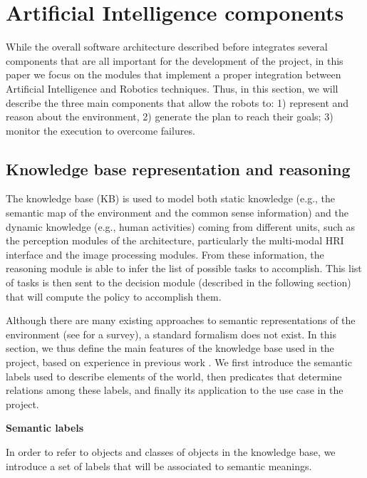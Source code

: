 \section{Artificial Intelligence components}

While the overall software architecture described before integrates several components that are all important for the development of the project, in this paper we focus on the modules that implement a proper integration between Artificial Intelligence and Robotics techniques.
Thus, in this section, we will describe the three main components that allow the robots to: 1) represent and reason about the environment, 2) generate the plan to reach their goals; 3) monitor the execution to overcome failures.



\subsection{Knowledge base representation and reasoning}


The knowledge base (KB) is used to model both static knowledge (e.g., the semantic map of the environment and the common sense information) and the dynamic knowledge (e.g., human activities) coming from different units, such as the perception modules of the architecture, particularly the multi-modal HRI interface and the image processing modules. 
From these information, the reasoning module is able to infer the list of possible tasks to accomplish. This list of tasks is then sent to the decision module (described in the following section) that will compute the policy to accomplish them. 

Although there are many existing approaches to semantic representations of the environment (see \cite{KoGa14} for a survey), a standard formalism does not exist.
In this section, we thus define the main features of the knowledge base used in the project,
based on experience in previous work \cite{icar13bastianelli}. We first introduce the semantic labels used to describe elements of the world, then predicates that determine relations among these labels, and finally its application to the use case in the project.

\vspace{1em}

\noindent 
\textbf{Semantic labels}

In order to refer to objects and classes of objects in the knowledge base, we introduce a set of labels that will be associated to semantic meanings. 

